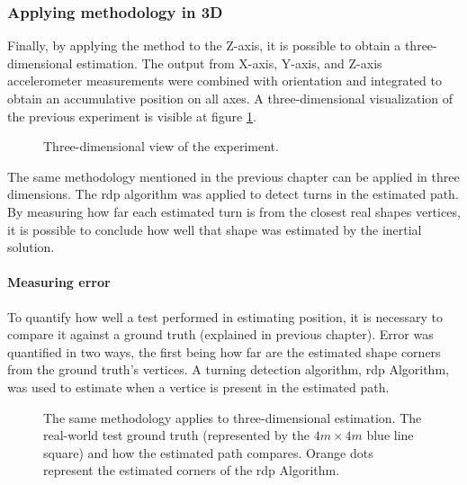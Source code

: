 \newpage

\subsubsection{Applying methodology in 3D}

Finally, by applying the method to the Z-axis, it is possible to obtain a  three-dimensional estimation. The output from X-axis, Y-axis, and Z-axis accelerometer measurements were combined with orientation and integrated to obtain an accumulative position on all axes.
A three-dimensional visualization of the previous experiment is visible at figure \ref{fig:square3D}.

\begin{figure}[!h]
    \centering
    \resizebox{0.8\linewidth}{!}{}
    \caption{Three-dimensional view of the experiment.}
    \label{fig:square3D}
\end{figure}

The same methodology mentioned in the previous chapter can be applied in three dimensions. The \acrshort{rdp} algorithm was applied to detect turns in the estimated path. By measuring how far each estimated turn is from the closest real shapes vertices, it is possible to conclude how well that shape was estimated by the inertial solution.

\paragraph{Measuring error}


To quantify how well a test performed in estimating position, it is necessary to compare it against a ground truth (explained in previous chapter). Error was quantified in two ways, the first being how far are the estimated shape corners from the ground truth's vertices. A turning detection algorithm, \acrshort{rdp} Algorithm, was used to estimate when a vertice is present in the estimated path.


\begin{figure}[!h]
    \centering
    \resizebox{0.8\linewidth}{!}{}
    \caption{The same methodology applies to three-dimensional estimation. The real-world test ground truth (represented by the $4m\times 4m$ blue line square) and how the estimated path compares. Orange dots represent the estimated corners of the \acrshort{rdp} Algorithm.}
    \label{fig:square3D_truth}
\end{figure}

